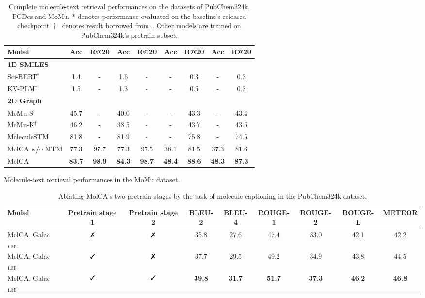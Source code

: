 \documentclass[11pt]{article}
\begin{document}
\begin{table*}[t!]
\begin{subtable}[t]{\textwidth}
\begin{tabular}{lcccccccc}
   Model & Acc & \multicolumn{1}{c}{R@20} & Acc & \multicolumn{1}{c}{R@20} & \multicolumn{1}{c}{Acc} & R@20 & \multicolumn{1}{c}{Acc} & R@20 \\\midrule
   \multicolumn{2}{l}{\textbf{1D SMILES}} & & \multicolumn{1}{l}{} & & & \multicolumn{1}{l}{} & & \multicolumn{1}{l}{} \\
   Sci-BERT$^\dag$ & 1.4 & - & 1.6 & - & - & 0.3 & - & 0.3 \\
   KV-PLM$^\dag$ & 1.5 & - & 1.3 & - & - & 0.5 & - & 0.3 \\\midrule
   \multicolumn{2}{l}{\textbf{2D Graph}} & & \multicolumn{1}{l}{} & & & \multicolumn{1}{l}{} & & \multicolumn{1}{l}{} \\
   MoMu-S$^\dag$ & 45.7 & - & 40.0 & - & - & 43.3 & - & 43.4 \\
   MoMu-K$^\dag$ & 46.2 & - & 38.5 & - & - & 43.7 & - & 43.5 \\
   MoleculeSTM & 81.8 & - & 81.9 & - & - & 75.8 & - & 74.5 \\
   MolCA w/o MTM & 77.3 & \multicolumn{1}{c}{97.7} & 77.3 & \multicolumn{1}{c}{97.5} & \multicolumn{1}{c}{38.1} & 81.5 & \multicolumn{1}{c}{37.3} & 81.6 \\
   MolCA & \textbf{83.7} & \multicolumn{1}{c}{\textbf{98.9}} & \textbf{84.3} & \multicolumn{1}{c}{\textbf{98.7}} & \multicolumn{1}{c}{\textbf{48.4}} & \textbf{88.6} & \multicolumn{1}{c}{\textbf{48.3}} & \textbf{87.3} \\\bottomrule
   \end{tabular}
   \caption{Molecule-text retrieval performances in the MoMu dataset.}
   \end{subtable}
   \caption{Complete molecule-text retrieval performances on the datasets of PubChem324k, PCDes and MoMu. * denotes performance evaluated on the baseline's released checkpoint. $\dag$ ~denotes result borrowed from~\cite{MoMu}. Other models are trained on PubChem324k's pretrain subset.}
   \label{tab:full_retrieval}
   \end{table*}

   \begin{table*}[t]
    \small
    \centering
    \setlength{\tabcolsep}{3pt}
    \begin{tabular}{lcccccccc} \toprule
    Model & Pretrain stage 1 & Pretrain stage 2 & BLEU-2 & BLEU-4 & ROUGE-1 & ROUGE-2 & ROUGE-L & METEOR \\\midrule
    MolCA, Galac$_{\text{1.3B}}$ & $\text{\xmark}$ & $\text{\xmark}$ & 35.8 & 27.6 & 47.4 & 33.0 & 42.1 & 42.2 \\
    MolCA, Galac$_{\text{1.3B}}$ & $\text{\cmark}$ & $\text{\xmark}$ & 37.7 & 29.5 & 49.2 & 34.9 & 43.8 & 44.5 \\
    MolCA, Galac$_{\text{1.3B}}$ & $\text{\cmark}$ & \textbf{$\text{\cmark}$} & \textbf{39.8} & \textbf{31.7} & \textbf{51.7} & \textbf{37.3} & \textbf{46.2} & \textbf{46.8} \\ \bottomrule
    \end{tabular}
    \caption{Ablating MolCA's two pretrain stages by the task of molecule captioning in the PubChem324k dataset.}
    \label{tab:ablate_pretrain}
   \end{table*}
\end{document}
